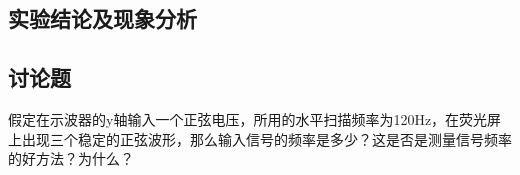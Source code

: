\documentclass[signature=data]{physicsreport}
\begin{document}
\maketitle

\newpage
\subsection{实验结论及现象分析}
\vspace{8em}


\subsection{讨论题}
假定在示波器的y轴输入一个正弦电压，所用的水平扫描频率为120Hz，在荧光屏上出现三个稳定的正弦波形，那么输入信号的频率是多少？这是否是测量信号频率的好方法？为什么？
\end{document}
